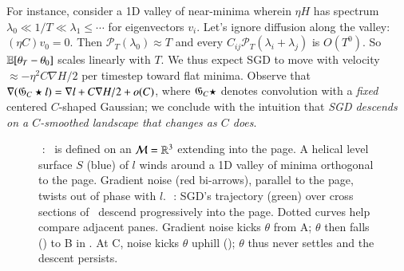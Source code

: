 For instance, consider a 1D valley of near-minima wherein $\eta H$ has spectrum
$\lambda_0 \ll 1/T \ll \lambda_1 \leq \cdots$ for eigenvectors
$v_i$.  Let's ignore diffusion along the valley: $(\eta C) v_0 =
0$.
%
Then ${\mathcal P}_T(\lambda_0)\approx T$ and every
$C_{ij}{\mathcal P}_T(\lambda_i+\lambda_j)$ is $O(T^0)$.  So $\mathbb{E}[\theta_T-\theta_0]$
scales linearly with $T$.  We thus expect SGD to move with
velocity $\approx -\eta^2 C\nabla H/2$ per timestep toward flat minima.  
Observe that $\nabla ({\frak G}_C \star l) = \nabla l+C\nabla
H/2 + o(C)$, where ${\frak G}_C \star$ denotes convolution with a
\emph{fixed} centered $C$-shaped Gaussian; we conclude with the
intuition that \emph{SGD descends on a $C$-smoothed landscape that
changes as $C$ does}.  %

\begin{figure}[h!]
    \hspace{-0.04cm}
    \squash
    \caption{%
        {\,\,\protect{}}: \Helix\ is defined on an $\mathcal{M}=\mathbb{R}^3$ 
        extending into the page.  A helical
        level surface $S$ (blue) of $l$ winds around 
        a 1D valley of minima orthogonal to the
        page.
        Gradient noise (red bi-arrows),
        parallel to the page, twists out of phase with $l$.
        {\,\,\protect{}}: SGD's trajectory (green) over 
        cross sections of \Helix\ descend progressively
        into the page.
        Dotted
        curves help compare adjacent panes.
        Gradient noise kicks $\theta$ from A; $\theta$ then falls
        (\!\!\protect{}) to B in
        {\!\!\protect{}}.  At C, noise kicks $\theta$
        uphill (\!\!\protect{}); $\theta$ thus never
        settles and the descent persists.
    }
    \squash\squash
    \label{fig:archimedes}
\end{figure}

